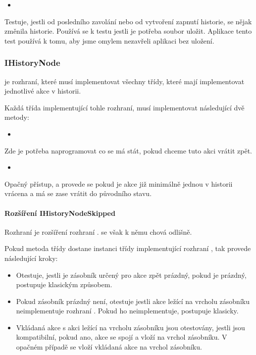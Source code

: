 \documentclass[
  field=inf,
  biblatex,
  glossaries,
  index
]{kidiplom}
\begin{document}
\begin{itemize}
\item {}
\end{itemize}
Testuje, jestli od posledního zavolání  nebo od vytvoření zapnutí historie, se nějak změnila historie. Používá se k testu jestli je potřeba soubor uložit. Aplikace tento test používá k tomu, aby jsme omylem nezavřeli aplikaci bez uložení.

\subsubsection{IHistoryNode}
 je rozhraní, které musí implementovat všechny třídy, které mají implementovat jednotlivé akce v historii.

Každá třída implementující tohle rozhraní, musí implementovat následující dvě metody:

\begin{itemize}
\item {}
\end{itemize}
Zde je potřeba naprogramovat co se má stát, pokud chceme tuto akci vrátit zpět.

\begin{itemize}
\item {}
\end{itemize}
Opačný přístup, a provede se pokud je akce již minimálně jednou v historii vrácena a má se zase vrátit do původního stavu.

\paragraph{Rozšíření IHistoryNodeSkipped}
Rozhraní  je rozšíření rozhraní .  se však k němu chová odlišně.

Pokud metoda  třídy  dostane instanci třídy implementující rozhraní , tak provede následující kroky:

\begin{itemize}
\item Otestuje, jestli je zásobník určený pro akce zpět prázdný, pokud je prázdný, postupuje klasickým způsobem.
\item Pokud zásobník prázdný není, otestuje jestli akce ležící na vrcholu zásobníku neimplementuje rozhraní . Pokud ho neimplementuje, postupuje klasicky.
\item Vkládaná akce s akci ležící na vrcholu zásobníku jsou otestovány, jestli jsou kompatibilní, pokud ano, akce se spojí a vloží na vrchol zásobníku. V opačném případě se vloží vkládaná akce na vrchol zásobníku.
\end{itemize}
\end{document}
